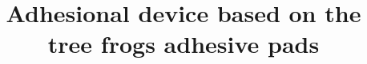\documentclass[article, whitelogo, oneside]{tudelft-report}
\begin{document}
\frontmatter


%


\title[black]{Adhesional device based on the tree frogs adhesive pads}

\subtitle[tudelft-black]{}
\author[tudelft-black]{}





% 
% 


\newpage
\thispagestyle{plain} %
\mbox{}



\newpage
\thispagestyle{plain} %
\mbox{}

\setcounter{tocdepth}{2}
{\small\tableofcontents}
%


\mainmatter







%
%

\printbibliography



\appendix
%
\end{document}
